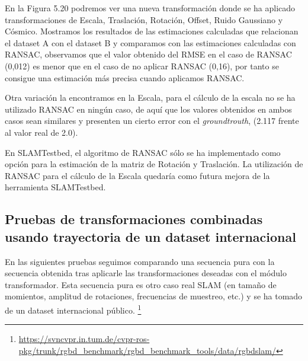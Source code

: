 En la Figura 5.20 podremos ver una nueva transformación donde se ha aplicado transformaciones de Escala, Traslación, Rotación, Offset, Ruido Gaussiano y Cósmico. Mostramos los resultados de las estimaciones calculadas que relacionan el dataset A con el dataset B y comparamos con las estimaciones calculadas con RANSAC, observamos que el valor obtenido del RMSE en el caso de RANSAC (0,012) es menor que en el caso de no aplicar RANSAC (0,16), por tanto se consigue una estimación más precisa cuando aplicamos RANSAC.

Otra variación la encontramos en la Escala, para el cálculo de la escala no se ha utilizado RANSAC en ningún caso, de aquí que los valores obtenidos en ambos casos sean similares y presenten un cierto error con el \textit{groundtrouth}, (2.117 frente al valor real de 2.0). 

En SLAMTestbed, el algoritmo de RANSAC sólo se ha implementado como opción para la estimación de la matriz de Rotación y Traslación.
La utilización de RANSAC para el cálculo de la Escala quedaría como futura mejora de la herramienta SLAMTestbed.


\newpage

\subsection {Pruebas de transformaciones combinadas usando trayectoria de un dataset internacional}

En las siguientes pruebas seguimos comparando una secuencia pura con la secuencia obtenida tras aplicarle las transformaciones deseadas con el módulo transformador. Esta secuencia pura es otro caso real SLAM (en tamaño de momientos, amplitud de rotaciones, frecuencias de muestreo, etc.) y se ha tomado de un dataset internacional público. \footnote{\url{https://svncvpr.in.tum.de/cvpr-ros-pkg/trunk/rgbd_benchmark/rgbd_benchmark_tools/data/rgbdslam/}}

